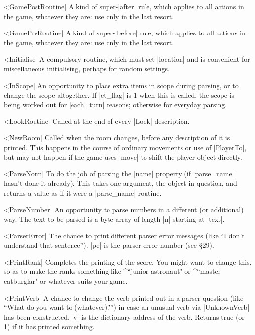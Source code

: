 ^^|GamePostRoutine|
A kind of super-|after| rule, which applies to all actions in the game,
whatever they are: use only in the last resort.

^^|GamePreRoutine|
A kind of super-|before| rule, which applies to all actions in the game,
whatever they are: use only in the last resort.

^^|Initialise|
A compulsory routine, which must set |location| and is convenient for
miscellaneous initialising, perhaps for random settings.

^^|InScope|
An opportunity to place extra items in scope during parsing, or to change
the scope altogether.  If |et_flag| is 1 when this is called, the scope is
being worked out for |each_turn| reasons; otherwise for everyday parsing.

^^|LookRoutine|
Called at the end of every |Look| description.

^^|NewRoom|
Called when the room changes, before any description of it is printed.  This
happens in the course of ordinary movements or use of |PlayerTo|, but may
not happen if the game uses |move| to shift the player object directly.

^^|ParseNoun|
To do the job of parsing the |name| property (if |parse_name| hasn't done
it already).  This takes one argument, the object in question, and returns
a value as if it were a |parse_name| routine.

^^|ParseNumber|
An opportunity to parse numbers in a different (or additional) way.  The
text to be parsed is a byte array of length |n| starting at |text|.

^^|ParserError|
The chance to print different parser error messages (like ``I don't
understand that sentence'').  |pe| is the parser error number (see \S 29).

^^|PrintRank|
Completes the printing of the score.  You might want to change this, so as
to make the ranks something like ^{``junior astronaut"} or ^{``master
catburglar"} or whatever suits your game.

^^|PrintVerb|
A chance to change the verb printed out in a parser question (like ``What do
you want to (whatever)?'') in case an unusual verb via |UnknownVerb| has
been constructed.  |v| is the dictionary address of the verb.
Returns true (or 1) if it has printed something.

